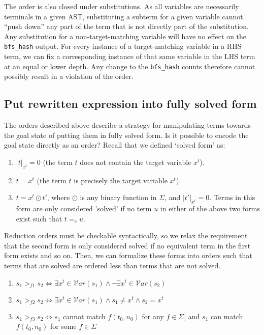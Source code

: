 The order is also closed under substitutions. As all variables are necessarily terminals in a given AST, substituting a subterm for a given variable cannot ``push down'' any part of the term that is not directly part of the substitution. Any substitution for a non-target-matching variable will have no effect on the \texttt{bfs_hash} output. For every instance of a target-matching variable in a RHS term, we can fix a corresponding instance of that same variable in the LHS term at an equal or lower depth. Any change to the \texttt{bfs_hash} counts therefore cannot possibly result in a violation of the order.

\subsection{Put rewritten expression into fully solved form}

The orders described above describe a strategy for manipulating terms towards the goal state of putting them in fully solved form. Is it possible to encode the goal state directly as an order? Recall that we defined `solved form' as:

\begin{enumerate}
  \item $|t|_{x^t} = 0$ (the term $t$ does not contain the target variable $x^t$).
  \item $t = x^t$ (the term $t$ is precisely the target variable $x^t$).
  \item $t = x^t \odot t'$, where $\odot$ is any binary function in $\Sigma$, and $|t'|_{x^t} = 0$. Terms in this form are only considered 'solved' if no term $u$ in either of the above two forms exist such that $t =_e u$.
\end{enumerate}

Reduction orders must be checkable syntactically, so we relax the requirement that the second form is only considered solved if no equivalent term in the first form exists and so on. Then, we can formalize these forms into orders such that terms that are solved are ordered less than terms that are not solved.

\begin{enumerate}
    \item $s_1 >_{f1} s_2 \iff \exists x^t \in \mathcal{V}ar(s_1) \wedge \neg \exists x^t \in \mathcal{V}ar(s_2)$
    \item $s_1 >_{f2} s_2 \iff \exists x^t \in \mathcal{V}ar(s_1) \wedge s_1 \neq x^t \wedge s_2 = x^t$
    \item $s_1 >_{f3} s_2 \iff s_1$ cannot match $f(t_0, n_0)$ for any $f \in \Sigma$, and $s_1$ can match $f(t_0, n_0)$ for some $f \in \Sigma$
\end{enumerate}

